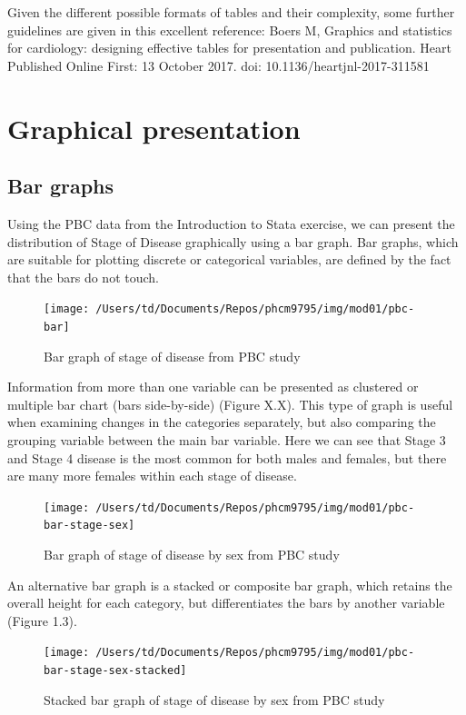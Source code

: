 \documentclass[
]{memoir}
\begin{document}
Given the different possible formats of tables and their complexity, some further guidelines are given in this excellent reference: Boers M, Graphics and statistics for cardiology: designing effective tables for presentation and publication. Heart Published Online First: 13 October 2017. doi: 10.1136/heartjnl-2017-311581

\hypertarget{graphical-presentation}{%
\section{Graphical presentation}\label{graphical-presentation}}

\hypertarget{bar-graphs}{%
\subsection{Bar graphs}\label{bar-graphs}}

Using the PBC data from the Introduction to Stata exercise, we can present the distribution of Stage of Disease graphically using a bar graph. Bar graphs, which are suitable for plotting discrete or categorical variables, are defined by the fact that the bars do not touch.

\begin{figure}
\texttt{[image: /Users/td/Documents/Repos/phcm9795/img/mod01/pbc-bar]} \caption{Bar graph of stage of disease from PBC study}\label{fig:fig-1-1}
\end{figure}

Information from more than one variable can be presented as clustered or multiple bar chart (bars side-by-side) (Figure X.X). This type of graph is useful when examining changes in the categories separately, but also comparing the grouping variable between the main bar variable. Here we can see that Stage 3 and Stage 4 disease is the most common for both males and females, but there are many more females within each stage of disease.

\begin{figure}
\texttt{[image: /Users/td/Documents/Repos/phcm9795/img/mod01/pbc-bar-stage-sex]} \caption{Bar graph of stage of disease by sex from PBC study}\label{fig:fig-1-2}
\end{figure}

An alternative bar graph is a stacked or composite bar graph, which retains the overall height for each category, but differentiates the bars by another variable (Figure 1.3).

\begin{figure}
\texttt{[image: /Users/td/Documents/Repos/phcm9795/img/mod01/pbc-bar-stage-sex-stacked]} \caption{Stacked bar graph of stage of disease by sex from PBC study}\label{fig:fig-1-3}
\end{figure}
\end{document}

